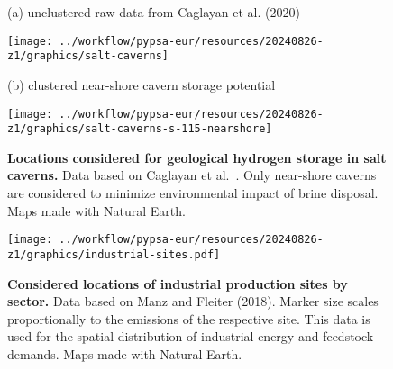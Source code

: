 \begin{figure*}
    \footnotesize
    (a) unclustered raw data from Caglayan et al. (2020) \\
    \begin{center}
        \texttt{[image: ../workflow/pypsa-eur/resources/20240826-z1/graphics/salt-caverns]}\\
    \end{center}
    (b) clustered near-shore cavern storage potential \\
    \begin{center}
        \texttt{[image: ../workflow/pypsa-eur/resources/20240826-z1/graphics/salt-caverns-s-115-nearshore]}
    \end{center}
    \caption{\textbf{Locations considered for geological hydrogen storage in
    salt caverns.} Data based on Caglayan et
    al.~\cite{caglayanTechnicalPotentialSalt2020}. Only near-shore caverns are
    considered to minimize environmental impact of brine disposal. Maps made
    with Natural Earth.}
    \label{fig:si:hydrogen-caverns}
\end{figure*}


\begin{figure*}
    \centering
    \texttt{[image: ../workflow/pypsa-eur/resources/20240826-z1/graphics/industrial-sites.pdf]}
    \caption{\textbf{Considered locations of industrial production sites by
    sector.} Data based on Manz and
    Fleiter (2018). Marker size scales
    proportionally to the emissions of the respective site. This data is used
    for the spatial distribution of industrial energy and feedstock demands.
    Maps made with Natural Earth.}
    \label{fig:si:industrial-sites}
\end{figure*}

